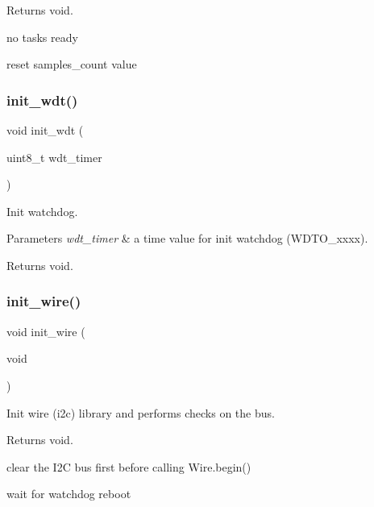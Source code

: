 \begin{DoxyReturn}{Returns}
void. 
\end{DoxyReturn}
no tasks ready

reset samples\+\_\+count value \mbox{\label{i2c-th_8h_a980e73df66b14b1190bc25da430a4f12}} 
\subsubsection{\texorpdfstring{init\+\_\+wdt()}{init\_wdt()}}
{\footnotesize\ttfamily void init\+\_\+wdt (\begin{DoxyParamCaption}\item[{uint8\+\_\+t}]{wdt\+\_\+timer }\end{DoxyParamCaption})}



Init watchdog. 


\begin{DoxyParams}{Parameters}
{\em wdt\+\_\+timer} & a time value for init watchdog (W\+D\+T\+O\+\_\+xxxx). \\
\hline
\end{DoxyParams}
\begin{DoxyReturn}{Returns}
void. 
\end{DoxyReturn}
\mbox{\label{i2c-th_8h_a7c21452937863fa02a29654247eef09b}} 
\subsubsection{\texorpdfstring{init\+\_\+wire()}{init\_wire()}}
{\footnotesize\ttfamily void init\+\_\+wire (\begin{DoxyParamCaption}\item[{void}]{ }\end{DoxyParamCaption})}



Init wire (i2c) library and performs checks on the bus. 

\begin{DoxyReturn}{Returns}
void. 
\end{DoxyReturn}
clear the I2C bus first before calling Wire.\+begin()

wait for watchdog reboot \mbox{\label{i2c-th_8h_a1be652e7d942160a14a560e0be837358}} 
